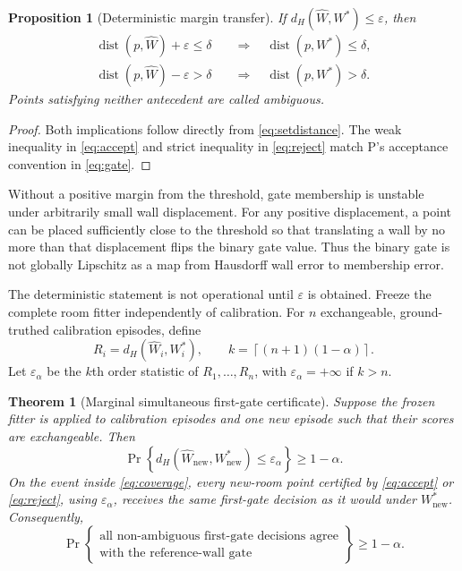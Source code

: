 \documentclass{article}
\newtheorem{theorem}{Theorem}
\newtheorem{proposition}{Proposition}
\begin{document}
\begin{proposition}[Deterministic margin transfer]
If $d_H(\widehat W,W^*)\leq\varepsilon$, then
\begin{align}
 \operatorname{dist}(p,\widehat W)+\varepsilon\leq\delta
 &\quad\Longrightarrow\quad \operatorname{dist}(p,W^*)\leq\delta, \label{eq:accept}\\
 \operatorname{dist}(p,\widehat W)-\varepsilon>\delta
 &\quad\Longrightarrow\quad \operatorname{dist}(p,W^*)>\delta. \label{eq:reject}
\end{align}
Points satisfying neither antecedent are called ambiguous.
\end{proposition}

\begin{proof}
Both implications follow directly from \eqref{eq:setdistance}. The weak inequality in \eqref{eq:accept} and strict inequality in \eqref{eq:reject} match P's acceptance convention in \eqref{eq:gate}.
\end{proof}

Without a positive margin from the threshold, gate membership is unstable under arbitrarily small wall displacement. %
For any positive displacement, a point can be placed sufficiently close to the threshold so that translating a wall by no more than that displacement flips the binary gate value. %
Thus the binary gate is not globally Lipschitz as a map from Hausdorff wall error to membership error. %

The deterministic statement is not operational until $\varepsilon$ is obtained. Freeze the complete room fitter independently of calibration. %
For $n$ exchangeable, ground-truthed calibration episodes, define
\begin{equation}
 R_i=d_H(\widehat W_i,W_i^*), \qquad
 k=\left\lceil(n+1)(1-\alpha)\right\rceil .
 \label{eq:scores}
\end{equation}
Let $\varepsilon_\alpha$ be the $k$th order statistic of $R_1,\ldots,R_n$, with $\varepsilon_\alpha=+\infty$ if $k>n$. %

\begin{theorem}[Marginal simultaneous first-gate certificate]
Suppose the frozen fitter is applied to calibration episodes and one new episode such that their scores are exchangeable. Then
\begin{equation}
 \Pr\!\left\{d_H(\widehat W_{\mathrm{new}},W^*_{\mathrm{new}})
 \leq\varepsilon_\alpha\right\}\geq 1-\alpha.
 \label{eq:coverage}
\end{equation}
On the event inside \eqref{eq:coverage}, every new-room point certified by \eqref{eq:accept} or \eqref{eq:reject}, using $\varepsilon_\alpha$, receives the same first-gate decision as it would under $W^*_{\mathrm{new}}$. Consequently,
\begin{equation}
 \Pr\!\left\{\substack{\text{all non-ambiguous first-gate decisions agree}\\
 \text{with the reference-wall gate}}\right\}
 \geq 1-\alpha.
 \label{eq:simultaneous}
\end{equation}
\end{theorem}
\end{document}

